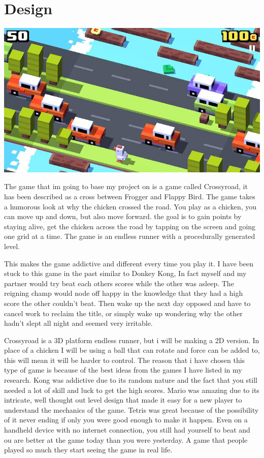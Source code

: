 \documentclass{article}
\begin{document}
\clearpage
\section{Design}
\begin{minipage}{0.4\textwidth}
\includegraphics[width=\linewidth]{crossyroad}
\end{minipage} \hfill
\begin{minipage}{0.55\textwidth}\raggedright
The game that im going to base my project on is a game called Crossyroad, it has been described as a cross between Frogger and Flappy Bird. The game takes a humorous look at why the chicken crossed the road. You play as a chicken, you can move up and down, but also move forward. the goal is to gain points by staying alive, get the chicken across the road by tapping on the screen and going one grid at a time. The game is an endless runner with a procedurally generated level.
\end{minipage} \newline

This makes the game addictive and different every time you play it. I have been stuck to this game in the past similar to Donkey Kong, In fact myself and my partner would try beat each others scores while the other was asleep. The reigning champ would node off happy in the knowledge that they had a high score the other couldn't beat. Then wake up the next day opposed and have to cancel work to reclaim the title, or simply wake up wondering why the other hadn't slept all night and seemed very irritable. \newline

Crossyroad is a 3D platform endless runner, but i will be making a 2D version. In place of a chicken I will be using a ball that can rotate and force can be added to, this will mean it will be harder to control. The reason that i have chosen this type of game is because of the best ideas from the games I have listed in my research. Kong was addictive due to its random nature and the fact that you still needed a lot of skill and luck to get the high scores. Mario was amazing due to its intricate, well thought out level design that made it easy for a new player to understand the mechanics of the game. Tetris was great because of the possibility of it never ending if only you were good enough to make it happen. Even on a handheld device with no internet connection, you still had yourself to beat and ou are better at the game today than you were yesterday. A game that people played so much they start seeing the game in real life.
\end{document}

